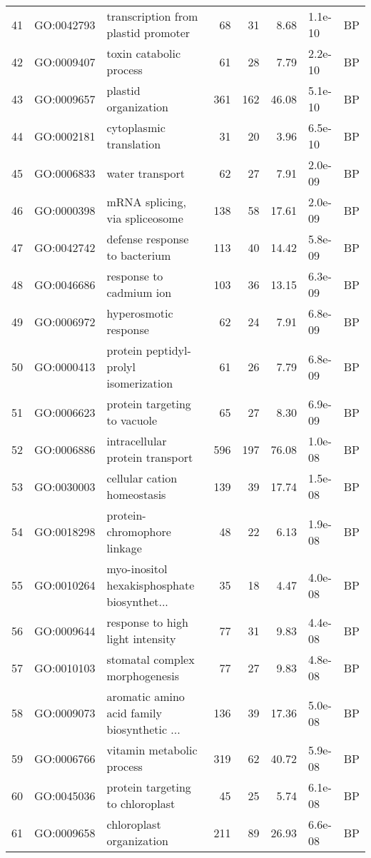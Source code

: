 \documentclass[12pt,oneside,a4paper]{article}
\begin{document}
\begin{longtable}{rllrrrll}
  41 & GO:0042793 & transcription from plastid promoter &  68 &  31 & 8.68 & 1.1e-10 & BP \\ 
  42 & GO:0009407 & toxin catabolic process &  61 &  28 & 7.79 & 2.2e-10 & BP \\ 
  43 & GO:0009657 & plastid organization & 361 & 162 & 46.08 & 5.1e-10 & BP \\ 
  44 & GO:0002181 & cytoplasmic translation &  31 &  20 & 3.96 & 6.5e-10 & BP \\ 
  45 & GO:0006833 & water transport &  62 &  27 & 7.91 & 2.0e-09 & BP \\ 
  46 & GO:0000398 & mRNA splicing, via spliceosome & 138 &  58 & 17.61 & 2.0e-09 & BP \\ 
  47 & GO:0042742 & defense response to bacterium & 113 &  40 & 14.42 & 5.8e-09 & BP \\ 
  48 & GO:0046686 & response to cadmium ion & 103 &  36 & 13.15 & 6.3e-09 & BP \\ 
  49 & GO:0006972 & hyperosmotic response &  62 &  24 & 7.91 & 6.8e-09 & BP \\ 
  50 & GO:0000413 & protein peptidyl-prolyl isomerization &  61 &  26 & 7.79 & 6.8e-09 & BP \\ 
  51 & GO:0006623 & protein targeting to vacuole &  65 &  27 & 8.30 & 6.9e-09 & BP \\ 
  52 & GO:0006886 & intracellular protein transport & 596 & 197 & 76.08 & 1.0e-08 & BP \\ 
  53 & GO:0030003 & cellular cation homeostasis & 139 &  39 & 17.74 & 1.5e-08 & BP \\ 
  54 & GO:0018298 & protein-chromophore linkage &  48 &  22 & 6.13 & 1.9e-08 & BP \\ 
  55 & GO:0010264 & myo-inositol hexakisphosphate biosynthet... &  35 &  18 & 4.47 & 4.0e-08 & BP \\ 
  56 & GO:0009644 & response to high light intensity &  77 &  31 & 9.83 & 4.4e-08 & BP \\ 
  57 & GO:0010103 & stomatal complex morphogenesis &  77 &  27 & 9.83 & 4.8e-08 & BP \\ 
  58 & GO:0009073 & aromatic amino acid family biosynthetic ... & 136 &  39 & 17.36 & 5.0e-08 & BP \\ 
  59 & GO:0006766 & vitamin metabolic process & 319 &  62 & 40.72 & 5.9e-08 & BP \\ 
  60 & GO:0045036 & protein targeting to chloroplast &  45 &  25 & 5.74 & 6.1e-08 & BP \\ 
  61 & GO:0009658 & chloroplast organization & 211 &  89 & 26.93 & 6.6e-08 & BP \\ 

\end{longtable}
\end{document}
